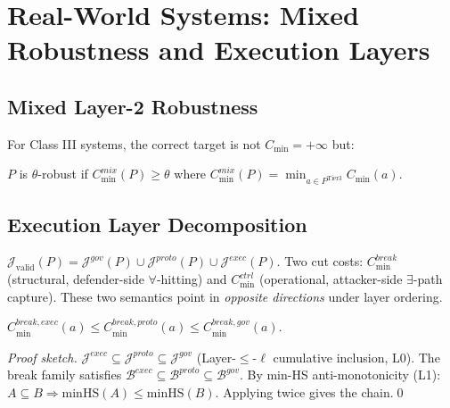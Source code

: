 \section{Real-World Systems: Mixed Robustness and Execution Layers}
\label{sec:mlr}

\subsection{Mixed Layer-2 Robustness}

For Class III systems, the correct target is not $C_{\min}=+\infty$ but:

\begin{definition}
$P$ is $\theta$-robust if $C_{\min}^{mix}(P)\geq\theta$ where
$C_{\min}^{mix}(P)=\min_{a\in P^{\mathrm{Tier3}}}C_{\min}(a)$.
\end{definition}

\subsection{Execution Layer Decomposition}

\begin{definition}
$\mathcal{J}_{\mathrm{valid}}(P)=\mathcal{J}^{gov}(P)\cup\mathcal{J}^{proto}(P)\cup\mathcal{J}^{exec}(P)$.
Two cut costs: $C_{\min}^{break}$ (structural, defender-side $\forall$-hitting)
and $C_{\min}^{ctrl}$ (operational, attacker-side $\exists$-path capture).
These two semantics point in \emph{opposite directions} under layer ordering.
\end{definition}


\begin{theorem}\label{thm:el-break}
$C_{\min}^{break,exec}(a) \leq C_{\min}^{break,proto}(a) \leq C_{\min}^{break,gov}(a)$.
\end{theorem}

\begin{proof}[Proof sketch]
$\mathcal{J}^{exec}\subseteq\mathcal{J}^{proto}\subseteq\mathcal{J}^{gov}$ (Layer-$\leq$-$\ell$
cumulative inclusion, L0). The break family satisfies
$\mathcal{B}^{exec}\subseteq\mathcal{B}^{proto}\subseteq\mathcal{B}^{gov}$.
By min-HS anti-monotonicity (L1): $A\subseteq B \Rightarrow \mathrm{minHS}(A)\leq\mathrm{minHS}(B)$.
Applying twice gives the chain.\qed
\end{proof}

